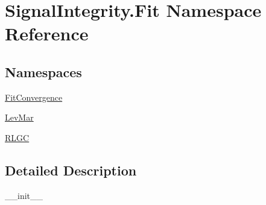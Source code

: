 \hypertarget{namespaceSignalIntegrity_1_1Fit}{}\section{Signal\+Integrity.\+Fit Namespace Reference}
\label{namespaceSignalIntegrity_1_1Fit}
\subsection*{Namespaces}
\begin{DoxyCompactItemize}
\item 
 \hyperlink{namespaceSignalIntegrity_1_1Fit_1_1FitConvergence}{Fit\+Convergence}
\item 
 \hyperlink{namespaceSignalIntegrity_1_1Fit_1_1LevMar}{Lev\+Mar}
\item 
 \hyperlink{namespaceSignalIntegrity_1_1Fit_1_1RLGC}{R\+L\+GC}
\end{DoxyCompactItemize}


\subsection{Detailed Description}
\begin{DoxyVerb}__init__\end{DoxyVerb}
 